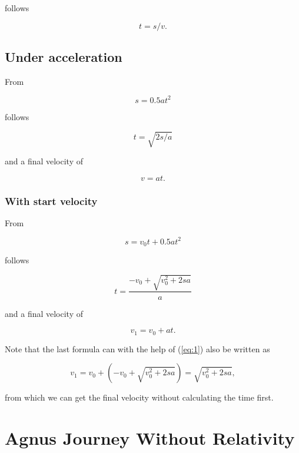 \documentclass[10pt]{article}
\numberwithin{equation}{section}
\begin{document}
	follows

	\begin{equation}
		t = s/v.
	\end{equation}
	
	\subsection{Under acceleration}
	
	From
	
	\begin{equation}
		s = 0.5at^2
	\end{equation}
	
	follows
	
	\begin{equation}
		t = \sqrt{2s/a}
	\end{equation}
	
	and a final velocity of
	
	\begin{equation}
		v=at.
	\end{equation}
	
	\subsubsection{With start velocity}
	
	From
	
	\begin{equation}
		s = v_0t + 0.5at^2
	\end{equation}
	
	follows
	
	\begin{equation}\label{eq:1}
		t = \frac{-v_0 + \sqrt{v^2_0 + 2sa}}{a}
	\end{equation}
	
	and a final velocity of
	
	\begin{equation}
		v_1 = v_0 + at.
	\end{equation}
	
	Note that the last formula can with the help of (\ref{eq:1}) also be written as
	
	\begin{equation}
		v_1=v_0 + (-v_0 + \sqrt{v^2_0+2sa}) = \sqrt{v^2_0+2sa},
	\end{equation}
	
	from which we can get the final velocity without calculating the time first.
	
	\section{Agnus Journey Without Relativity}
	
\end{document}
